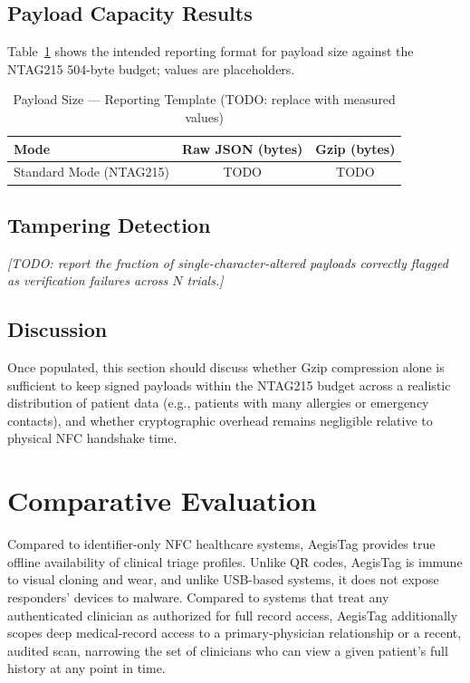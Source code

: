 \documentclass[conference]{IEEEtran}
\begin{document}
\subsection{Payload Capacity Results}
Table~\ref{tab:payload_sizes} shows the intended reporting format for payload size against the NTAG215 504-byte budget; values are placeholders.

\begin{table}[htbp]
\caption{Payload Size --- Reporting Template (TODO: replace with measured values)}
\begin{center}
\begin{tabular}{lcc}
\toprule
\textbf{Mode} & \textbf{Raw JSON (bytes)} & \textbf{Gzip (bytes)} \\
\midrule
Standard Mode (NTAG215) & TODO & TODO \\
\bottomrule
\end{tabular}
\label{tab:payload_sizes}
\end{center}
\end{table}

\subsection{Tampering Detection}
\textit{[TODO: report the fraction of single-character-altered payloads correctly flagged as verification failures across $N$ trials.]}

\subsection{Discussion}
Once populated, this section should discuss whether Gzip compression alone is sufficient to keep signed payloads within the NTAG215 budget across a realistic distribution of patient data (e.g., patients with many allergies or emergency contacts), and whether cryptographic overhead remains negligible relative to physical NFC handshake time.

\section{Comparative Evaluation}
Compared to identifier-only NFC healthcare systems, AegisTag provides true offline availability of clinical triage profiles. Unlike QR codes, AegisTag is immune to visual cloning and wear, and unlike USB-based systems, it does not expose responders' devices to malware. Compared to systems that treat any authenticated clinician as authorized for full record access, AegisTag additionally scopes deep medical-record access to a primary-physician relationship or a recent, audited scan, narrowing the set of clinicians who can view a given patient's full history at any point in time.
\end{document}
